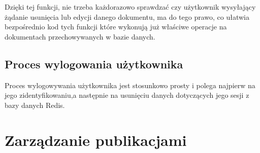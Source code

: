 \documentclass[a4paper,12pt,twoside,openany]{report}
\begin{document}
Dzięki tej funkcji, nie trzeba każdorazowo sprawdzać czy użytkownik wysyłający żądanie usunięcia lub edycji danego dokumentu, ma do tego prawo, co ułatwia bezpośrednio kod tych funkcji które wykonują już właściwe operacje na dokumentach przechowywanych w bazie danych.

\subsection{Proces wylogowania użytkownika}
Proces wylogowywania użytkownika jest stosunkowo prosty i polega najpierw na jego zidentyfikowaniu,a następnie na usunięciu danych dotyczących jego sesji z bazy danych Redis.
\section{Zarządzanie publikacjami}

\begin{thebibliography}{99}


\end{thebibliography}

\zakonczenie  %
\end{document}
